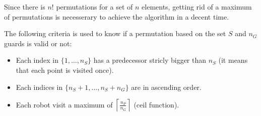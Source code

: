 Since there is $n!$ permutations for a set of $n$ elements, getting rid of a maximum of permutations is necesserary to achieve the algorithm in a decent time. 

\begin{criteria}
 The following criteria is used to know if a permutation based on the set $S$ and $n_G$ guards is valid or not:
 \begin{itemize}
  \item Each index in $\{1,\hdots,n_S\}$ has a predecessor stricly bigger than $n_S$ (it means that each point is visited once).
  \item Each indices in $\{n_S+1,\hdots,n_S+n_G\}$ are in ascending order.
  \item Each robot visit a maximum of $\left \lceil{\frac{n_P}{n_G}}\right \rceil$ (ceil function).
 \end{itemize}
 \label{permCriteria}
\end{criteria}